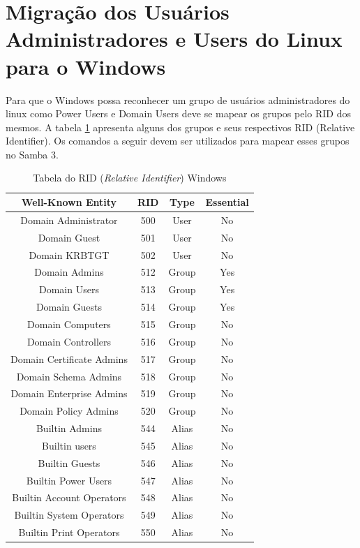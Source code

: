 \section{Migração dos Usuários Administradores e Users do Linux para o Windows}

Para que o Windows possa reconhecer um grupo de usuários administradores do linux como Power Users e Domain Users deve se mapear os grupos pelo RID dos mesmos. A tabela \ref{tab} apresenta alguns dos grupos e seus respectivos RID (Relative Identifier). Os comandos a seguir devem ser utilizados para mapear esses grupos no Samba 3.

\begin{table}[h!]
	\centering
	\caption{Tabela do RID (\textit{Relative Identifier}) Windows \cite{RID}}
	\begin{tabular}{cccc}
		
		\hline
		
		Well-Known Entity & RID & Type &	Essential \\
		
		\hline
		
		\hline
		
		Domain Administrator & 500 & User & No \\
		Domain Guest & 501 & User & No \\		
		Domain KRBTGT & 502	& User & No \\
		Domain Admins & 512 & Group & Yes \\
		Domain Users & 513 & Group & Yes \\
		Domain Guests & 514 & Group & Yes \\
		Domain Computers & 515 & Group & No \\
		Domain Controllers & 516 & Group & No \\
		Domain Certificate Admins & 517 & Group & No \\
		Domain Schema Admins & 518 & Group & No \\		
		Domain Enterprise Admins & 519 & Group & No \\
		Domain Policy Admins & 520 & Group & No \\
		Builtin Admins & 544 & Alias & No \\
		Builtin users & 545 & Alias & No \\
		Builtin Guests & 546 & Alias & No \\
		Builtin Power Users & 547 & Alias & No \\
		Builtin Account Operators & 548 & Alias & No \\
		Builtin System Operators & 549 & Alias & No \\
		Builtin Print Operators	& 550 & Alias & No \\
		 	
		\hline
	\end{tabular}
	\label{tab}
\end{table}

